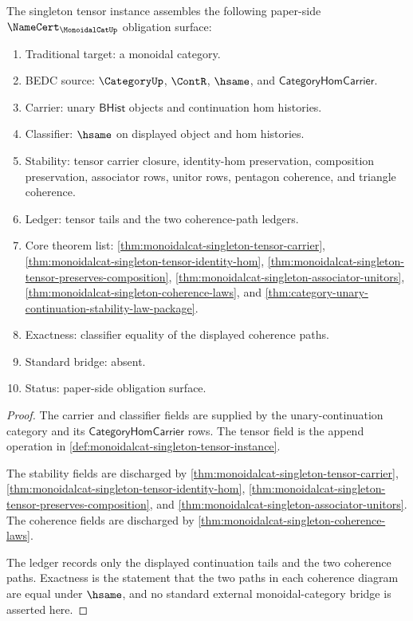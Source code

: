 \begin{theorem}
\label{thm:monoidalcat-namecert-obligation-surface}
The singleton tensor instance assembles the following paper-side $\NameCert_{\MonoidalCatUp}$ obligation surface:
\begin{enumerate}
  \item Traditional target: a monoidal category.
  \item BEDC source: $\CategoryUp$, $\ContR$, $\hsame$, and $\mathsf{CategoryHomCarrier}$.
  \item Carrier: unary $\mathsf{BHist}$ objects and continuation hom histories.
  \item Classifier: $\hsame$ on displayed object and hom histories.
  \item Stability: tensor carrier closure, identity-hom preservation, composition preservation, associator rows, unitor rows, pentagon coherence, and triangle coherence.
  \item Ledger: tensor tails and the two coherence-path ledgers.
  \item Core theorem list: \autoref{thm:monoidalcat-singleton-tensor-carrier}, \autoref{thm:monoidalcat-singleton-tensor-identity-hom}, \autoref{thm:monoidalcat-singleton-tensor-preserves-composition}, \autoref{thm:monoidalcat-singleton-associator-unitors}, \autoref{thm:monoidalcat-singleton-coherence-laws}, and \autoref{thm:category-unary-continuation-stability-law-package}.
  \item Exactness: classifier equality of the displayed coherence paths.
  \item Standard bridge: absent.
  \item Status: paper-side obligation surface.
\end{enumerate}
\end{theorem}
\begin{proof}
The carrier and classifier fields are supplied by the unary-continuation category and its $\mathsf{CategoryHomCarrier}$ rows. The tensor field is the append operation in \autoref{def:monoidalcat-singleton-tensor-instance}.

The stability fields are discharged by \autoref{thm:monoidalcat-singleton-tensor-carrier}, \autoref{thm:monoidalcat-singleton-tensor-identity-hom}, \autoref{thm:monoidalcat-singleton-tensor-preserves-composition}, and \autoref{thm:monoidalcat-singleton-associator-unitors}. The coherence fields are discharged by \autoref{thm:monoidalcat-singleton-coherence-laws}.

The ledger records only the displayed continuation tails and the two coherence paths. Exactness is the statement that the two paths in each coherence diagram are equal under $\hsame$, and no standard external monoidal-category bridge is asserted here.
\end{proof}

